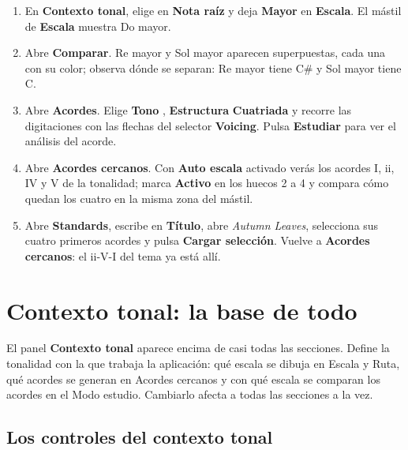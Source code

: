 \documentclass[a4paper,11pt,oneside]{report}
\providecommand{\tightlist}{\setlength{\itemsep}{2pt}\setlength{\parskip}{0pt}}
\let\originaltexttt\texttt
\renewcommand{\texttt}[1]{\originaltexttt{\seqsplit{#1}}}
\begin{document}
\begin{enumerate}
\def\labelenumi{\arabic{enumi}.}
\tightlist
\item
  En \textbf{Contexto tonal}, elige \texttt{C} en \textbf{Nota raíz} y deja \textbf{Mayor} en \textbf{Escala}. El mástil de \textbf{Escala} muestra Do mayor.
\item
  Abre \textbf{Comparar}. Re mayor y Sol mayor aparecen superpuestas, cada una con su color; observa dónde se separan: Re mayor tiene C\# y Sol mayor tiene C.
\item
  Abre \textbf{Acordes}. Elige \textbf{Tono} \texttt{C}, \textbf{Estructura} \textbf{Cuatriada} y recorre las digitaciones con las flechas del selector \textbf{Voicing}. Pulsa \textbf{Estudiar} para ver el análisis del acorde.
\item
  Abre \textbf{Acordes cercanos}. Con \textbf{Auto escala} activado verás los acordes I, ii, IV y V de la tonalidad; marca \textbf{Activo} en los huecos 2 a 4 y compara cómo quedan los cuatro en la misma zona del mástil.
\item
  Abre \textbf{Standards}, escribe \texttt{autumn} en \textbf{Título}, abre \emph{Autumn Leaves}, selecciona sus cuatro primeros acordes y pulsa \textbf{Cargar selección}. Vuelve a \textbf{Acordes cercanos}: el ii-V-I del tema ya está allí.
\end{enumerate}

\chapter{Contexto tonal: la base de todo}\label{contexto-tonal-la-base-de-todo}

El panel \textbf{Contexto tonal} aparece encima de casi todas las secciones. Define la tonalidad con la que trabaja la aplicación: qué escala se dibuja en Escala y Ruta, qué acordes se generan en Acordes cercanos y con qué escala se comparan los acordes en el Modo estudio. Cambiarlo afecta a todas las secciones a la vez.

\Needspace{3.5cm}
\section{Los controles del contexto tonal}\label{los-controles-del-contexto-tonal}
\end{document}
